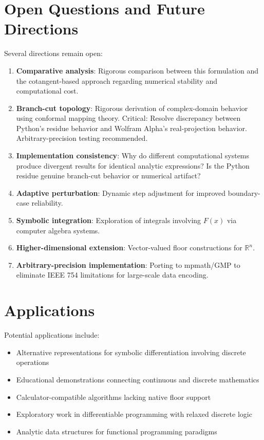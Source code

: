\documentclass[12pt, a4paper]{article}
\theoremstyle{note}
\newcommand{\Real}{\mathbb{R}}
\begin{document}
\section{Open Questions and Future Directions}
\label{sec:open_questions}

Several directions remain open:

\begin{enumerate}
    \item \textbf{Comparative analysis}: Rigorous comparison between this formulation and the cotangent-based approach regarding numerical stability and computational cost.
    \item \textbf{Branch-cut topology}: Rigorous derivation of complex-domain behavior using conformal mapping theory. Critical: Resolve discrepancy between Python's residue behavior and Wolfram Alpha's real-projection behavior. Arbitrary-precision testing recommended.
    \item \textbf{Implementation consistency}: Why do different computational systems produce divergent results for identical analytic expressions? Is the Python residue genuine branch-cut behavior or numerical artifact?
    \item \textbf{Adaptive perturbation}: Dynamic step adjustment for improved boundary-case reliability.
    \item \textbf{Symbolic integration}: Exploration of integrals involving $F(x)$ via computer algebra systems.
    \item \textbf{Higher-dimensional extension}: Vector-valued floor constructions for $\Real^n$.
    \item \textbf{Arbitrary-precision implementation}: Porting to mpmath/GMP to eliminate IEEE 754 limitations for large-scale data encoding.
\end{enumerate}

\section{Applications}

Potential applications include:
\begin{itemize}
    \item Alternative representations for symbolic differentiation involving discrete operations
    \item Educational demonstrations connecting continuous and discrete mathematics
    \item Calculator-compatible algorithms lacking native floor support
    \item Exploratory work in differentiable programming with relaxed discrete logic
    \item Analytic data structures for functional programming paradigms
\end{itemize}
\end{document}

